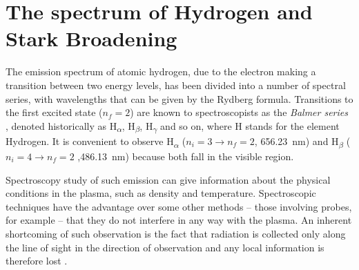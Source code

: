 \documentclass[../main.tex]{subfiles}
\begin{document}
\section{The spectrum of Hydrogen and Stark Broadening}\label{sec:hydrogen}
The emission spectrum of atomic hydrogen, due to the electron making a transition between two energy levels, has been divided into a number of spectral series, with wavelengths that can be given by the Rydberg formula. Transitions to the first excited state ($n_f=2$) are known to spectroscopists as the \textit{Balmer series} , denoted historically as H\textsubscript{$\alpha$}, H\textsubscript{$\beta$}, H\textsubscript{$\gamma$} and so on, where H stands for the element Hydrogen. It is convenient to observe H\textsubscript{$\alpha$} ($n_i=3 \to n_f=2$, \SI{656.23}{\nm}) and H\textsubscript{$\beta$} ($n_i=4 \to n_f=2$ ,\SI{486.13}{\nm}) because both fall in the visible region.

Spectroscopy study of such emission can give information about the physical conditions in the plasma, such as density and temperature. Spectroscopic techniques have the advantage over some other methods -- those involving probes, for example -- that they do not interfere in any way with the plasma. An inherent shortcoming of such observation is the fact that radiation is collected only along the line of sight in the direction of observation and any local information is therefore lost \cite{Thorne1988Spectrophysics}.
\end{document}
